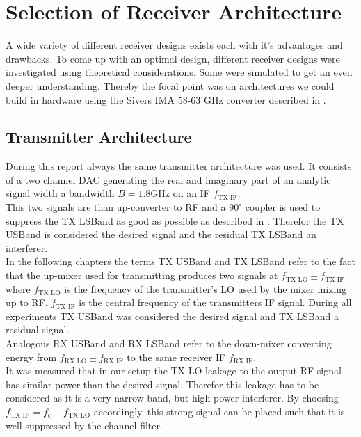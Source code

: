 \chapter{Selection of Receiver Architecture}
\label{chap:rx}

A wide variety of different receiver designs exists each with it's advantages
and drawbacks. To come up with an optimal design, different receiver designs
were investigated using theoretical considerations. Some were simulated to
get an even deeper understanding.
Thereby the focal point was on architectures we could
build in hardware using the Sivers IMA 58-63 GHz converter described in
. \\

\section{Transmitter Architecture}
During this report always the same transmitter architecture was used.
It consists of a two channel \gls{DAC} generating the real and imaginary
part of an analytic signal width a bandwidth $B = 1.8 \text{GHz}$
on an \gls{IF} $f_{\text{TX IF}}$. \\

This two signals are than up-converter to
\gls{RF} and a $90^\circ$ coupler is used to suppress the \gls{TX} \gls{LSBand}
as good as possible as described in .
Therefor the \gls{TX} \gls{USBand} is considered the desired signal and the
residual \gls{TX} \gls{LSBand} an interferer. \\

In the following chapters the terms \gls{TX} \gls{USBand} and \gls{TX}
\gls{LSBand} refer to the fact that the up-mixer used for transmitting
produces two signals at $f_{\text{TX LO}} \pm f_{\text{TX IF}}$ where
$f_{\text{TX LO}}$ is the frequency of the transmitter's \gls{LO}
used by the mixer mixing up to \gls{RF}. $f_{\text{TX IF}}$ is the central
frequency of the transmitters \gls{IF} signal. During all experiments
\gls{TX} \gls{USBand} was considered the desired signal and \gls{TX}
\gls{LSBand} a residual signal. \\

Analogous \gls{RX} \gls{USBand} and \gls{RX} \gls{LSBand} refer to
the down-mixer converting energy from $f_{\text{RX LO}} \pm f_{\text{RX IF}}$
to the same receiver \gls{IF} $f_{\text{RX IF}}$. \\

It was measured that in our setup the \gls{TX} \gls{LO} leakage
to the output \gls{RF} signal has similar power than the desired
signal. Therefor this leakage has to be considered as it is a very narrow band,
but high power interferer.
By choosing $f_{\text{TX IF}} = f_{\text{c}} - f_{\text{TX LO}}$ accordingly,
this strong signal can be placed such that it is well suppressed by the channel
filter. \\

